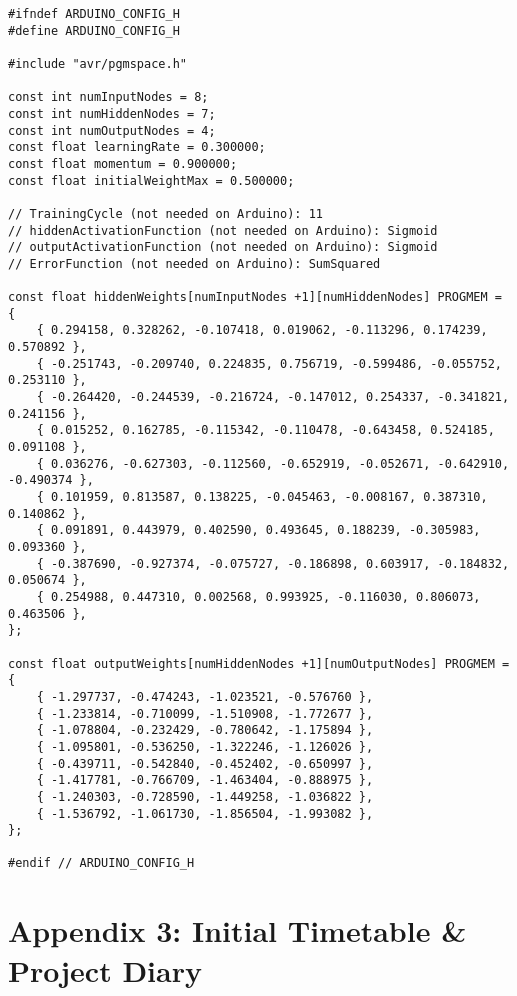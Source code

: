 \documentclass[a4paper]{article}
\begin{document}
\begin{lstlisting}
#ifndef ARDUINO_CONFIG_H
#define ARDUINO_CONFIG_H

#include "avr/pgmspace.h"

const int numInputNodes = 8;
const int numHiddenNodes = 7;
const int numOutputNodes = 4;
const float learningRate = 0.300000;
const float momentum = 0.900000;
const float initialWeightMax = 0.500000;

// TrainingCycle (not needed on Arduino): 11
// hiddenActivationFunction (not needed on Arduino): Sigmoid
// outputActivationFunction (not needed on Arduino): Sigmoid
// ErrorFunction (not needed on Arduino): SumSquared

const float hiddenWeights[numInputNodes +1][numHiddenNodes] PROGMEM = {
    { 0.294158, 0.328262, -0.107418, 0.019062, -0.113296, 0.174239, 0.570892 }, 
    { -0.251743, -0.209740, 0.224835, 0.756719, -0.599486, -0.055752, 0.253110 }, 
    { -0.264420, -0.244539, -0.216724, -0.147012, 0.254337, -0.341821, 0.241156 }, 
    { 0.015252, 0.162785, -0.115342, -0.110478, -0.643458, 0.524185, 0.091108 }, 
    { 0.036276, -0.627303, -0.112560, -0.652919, -0.052671, -0.642910, -0.490374 }, 
    { 0.101959, 0.813587, 0.138225, -0.045463, -0.008167, 0.387310, 0.140862 }, 
    { 0.091891, 0.443979, 0.402590, 0.493645, 0.188239, -0.305983, 0.093360 }, 
    { -0.387690, -0.927374, -0.075727, -0.186898, 0.603917, -0.184832, 0.050674 }, 
    { 0.254988, 0.447310, 0.002568, 0.993925, -0.116030, 0.806073, 0.463506 }, 
};

const float outputWeights[numHiddenNodes +1][numOutputNodes] PROGMEM = {
    { -1.297737, -0.474243, -1.023521, -0.576760 }, 
    { -1.233814, -0.710099, -1.510908, -1.772677 }, 
    { -1.078804, -0.232429, -0.780642, -1.175894 }, 
    { -1.095801, -0.536250, -1.322246, -1.126026 }, 
    { -0.439711, -0.542840, -0.452402, -0.650997 }, 
    { -1.417781, -0.766709, -1.463404, -0.888975 }, 
    { -1.240303, -0.728590, -1.449258, -1.036822 }, 
    { -1.536792, -1.061730, -1.856504, -1.993082 }, 
};

#endif // ARDUINO_CONFIG_H
\end{lstlisting}

\newpage
\section{Appendix 3: Initial Timetable \& Project Diary}
\label{sec:a3}
\end{document}
